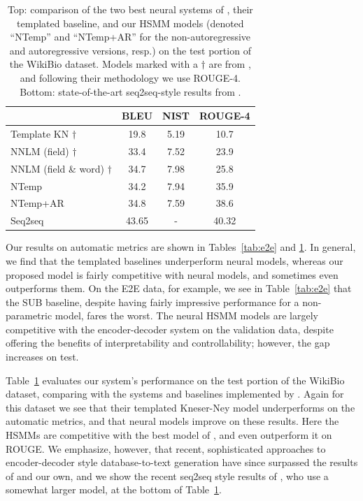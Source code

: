 \documentclass[11pt,a4paper]{article}
\begin{document}
\begin{table}[t!]
\small
\centering
\begin{tabular}{@{}lccc@{}}
\toprule
 & BLEU & NIST & ROUGE-4\\
\midrule
Template KN $\dagger$ & 19.8 & 5.19 & 10.7 \\
NNLM (field) $\dagger$ & 33.4 & 7.52 & 23.9 \\
NNLM (field \& word) $\dagger$ & 34.7 & 7.98 & 25.8 \\
NTemp &  34.2 & 7.94 & 35.9 \\
NTemp+AR &  34.8 & 7.59 & 38.6 \\
\midrule
Seq2seq~\citep{liu2018table} & 43.65 & - & 40.32 \\
\bottomrule
\end{tabular}
\caption{Top: comparison of the two best neural systems of \citet{lebret2016neural}, their templated baseline, and our HSMM models (denoted ``NTemp'' and ``NTemp+AR'' for the non-autoregressive and autoregressive versions, resp.) on the test portion of the WikiBio dataset. Models marked with a {$\dagger$} are from \citet{lebret2016neural}, and following their methodology we use ROUGE-4. Bottom: state-of-the-art seq2seq-style results from \citet{liu2018table}.}
\label{tab:wb}
\end{table}




Our results on automatic metrics are shown in Tables~\ref{tab:e2e} and \ref{tab:wb}. In general, we find that the templated baselines underperform neural models, whereas our proposed model is fairly competitive with neural models, and sometimes even outperforms them. On the E2E data, for example, we see in Table~\ref{tab:e2e} that the SUB baseline, despite having fairly impressive performance for a non-parametric model, fares the worst. The neural HSMM models are largely competitive with the encoder-decoder system on the validation data, despite offering the benefits of interpretability and controllability; however, the gap increases on test. 


Table~\ref{tab:wb}  evaluates our system's performance on the test portion of the WikiBio dataset, comparing with the systems and baselines implemented by \citet{lebret2016neural}.  Again for this dataset we see that their templated Kneser-Ney model underperforms on the automatic metrics, and that neural models improve on these results. Here the HSMMs are competitive with the best model of \citet{lebret2016neural}, and even outperform it on ROUGE. We emphasize, however, that recent, sophisticated approaches to encoder-decoder style database-to-text generation have since surpassed the results of \citet{lebret2016neural} and our own, and we show the recent seq2seq style results of \citet{liu2018table}, who use a somewhat larger model, at the bottom of Table~\ref{tab:wb}.
\end{document}
